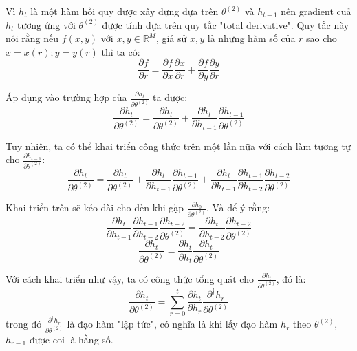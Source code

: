 Vì $h_t$ là một hàm hồi quy được xây dựng dựa trên $\theta^{(2)}$ và $h_{t-1}$ nên gradient cuả $h_t$ tương ứng với $\theta^{(2)}$ được tính dựa trên quy tắc "total derivative". Quy tắc này nói rằng nếu $f(x,y)$ với $x, y \in \mathbb{R}^M$, giả sử $x,y$ là những hàm số của $r$ sao cho $x = x(r); y = y(r)$ thì ta có:
\begin{equation} \label{gradientWRTSt6}
	\frac{\partial{f}}{\partial{r}} = \frac{\partial f}{\partial x}\frac{\partial x }{\partial r} + \frac{\partial f }{\partial y }\frac{\partial y }{\partial r }
\end{equation}

Áp dụng vào trường hợp của $\frac{\partial h_t}{\partial \theta^{(2)} }$ ta được:
\begin{equation} \label{gradientWRTSt7}
	\frac{\partial h_t}{ \partial \theta^{(2)}} = \frac{\partial h_t}{ \partial \theta^{(2)}} + \frac{\partial h_t }{\partial h_{t-1} } \frac{\partial h_{t-1}}{ \partial \theta^{(2)}}
\end{equation}

Tuy nhiên, ta có thể khai triển công thức trên một lần nữa với cách làm tương tự cho $\frac{\partial h_{t-1}}{\partial \theta^{(2)} }$:
\begin{equation} \label{gradientWRTSt8}
	\frac{\partial h_t}{\partial \theta^{(2)}} = \frac{\partial h_t}{\partial \theta^{(2)}} + \frac{\partial h_t }{\partial h_{t-1}} \frac{\partial h_{t-1}}{\partial \theta^{(2)}} + \frac{\partial h_t}{\partial h_{t-1}} \frac{\partial h_{t-1}}{\partial h_{t-2}} \frac{\partial h_{t-2}}{\partial \theta^{(2)}}
\end{equation}

Khai triển trên sẽ kéo dài cho đến khi gặp $\frac{\partial h_0}{\partial \theta^{(2)}}$. Và để ý rằng:
\begin{equation} \label{gradientWRTSt9}
	\frac{\partial h_t}{\partial h_{t-1}} \frac{\partial h_{t-1}}{\partial h_{t-2}} \frac{\partial h_{t-2}}{\partial \theta^{(2)}} = \frac{\partial h_t}{\partial h_{t-2}}\frac{\partial h_{t-2}}{\partial \theta^{(2)}}
\end{equation}
\begin{equation} \label{gradientWRTSt10}
	\frac{\partial h_{t}}{\partial \theta^{(2)}} = \frac{\partial h_{t}}{\partial h_t} \frac{\partial h_t}{\partial \theta^{(2)}}
\end{equation}

Với cách khai triển như vậy, ta có công thức tổng quát cho $\frac{\partial h_t}{\partial \theta^{(2)}}$, đó là:
\begin{equation} \label{gradientWRTSt11}
	\frac{\partial h_t}{\partial \theta^{(2)}} = \sum_{r=0}^{t} \frac{\partial h_{t}}{\partial h_r} \frac{\partial^{\dagger} h_r}{\partial \theta^{(2)}}
\end{equation}
trong đó $\frac{\partial^{\dagger} h_r}{\partial \theta^{(2)}}$ là đạo hàm "lập tức", có nghĩa là khi lấy đạo hàm $h_r$ theo $\theta^{(2)}$, $h_{r-1}$ được coi là hằng số.

